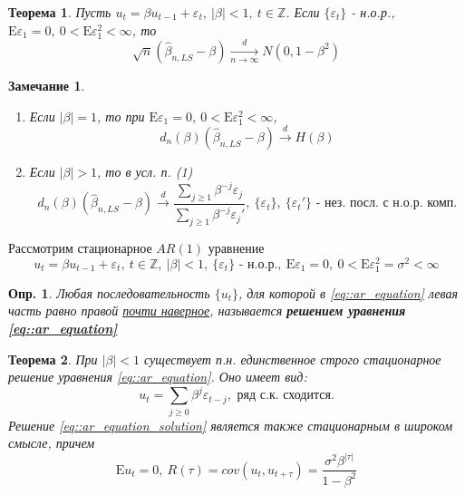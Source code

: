 \documentclass[12pt]{article}
\newtheorem{definition}{Опр.}
\newtheorem{theorem}{Теорема}
\newtheorem*{remark*}{Замечание}
\newcommand\defin[1]{\textbf{#1}}
\def\eps{ \varepsilon }
\def\Z{ \mathbb{Z} }
\def\E{ \mathrm{E} }
\begin{document}
\begin{theorem} \label{th::beta_ls_d_conv_ar}
    Пусть $u_t=\beta u_{t-1}+\eps_t,\ \left\lvert \beta\right\rvert <1,\ t\in\Z$. Если $\{\eps_t\}$ - н.о.р.,
    $\E\eps_1=0,\ 0<\E\eps_1^2<\infty$, то
    \[\sqrt{n}(\widehat{\beta}_{n,LS}-\beta)\underset{n\rightarrow\infty}{\xrightarrow{d}}N(0,1-\beta^2)\]
\end{theorem}
\begin{remark*}
    \begin{enumerate}
        \item Если $\left\lvert \beta\right\rvert =1$, то при $\E\eps_1=0,\ 0<\E\eps_1^2<\infty$,
        \[d_n(\beta)(\widehat{\beta}_{n,LS}-\beta)\xrightarrow{d}H(\beta)\]
        \item Если $\left\lvert \beta\right\rvert >1$, то в усл. п. (1)
        \[d_n(\beta)(\widehat{\beta}_{n,LS}-\beta)\xrightarrow{d}\frac{\sum_{j\geq1}\beta^{-j}\eps_j}{\sum_{j\geq1}\beta^{-j}\eps_j'},\ \{\eps_t\},\ \{\eps_t'\}\text{ - нез. посл. с н.о.р. комп.}\]
    \end{enumerate}
\end{remark*}
Рассмотрим стационарное $AR(1)$ уравнение
\begin{equation}\label{eq::ar_equation}
    u_t=\beta u_{t-1}+\eps_t,\ t\in\Z,\ \left\lvert \beta\right\rvert <1,\ \{\eps_t\}\text{ - н.о.р.},\ \E\eps_1=0,\ 0<\E\eps_1^2=\sigma^2<\infty
\end{equation}
\begin{definition}
    Любая последовательность $\{u_t\}$, для которой в \eqref{eq::ar_equation} левая часть
    равно правой \underline{почти наверное}, называется \defin{решением уравнения \eqref{eq::ar_equation}}
\end{definition}
\begin{theorem} \label{th::single_stat_solution_ar}
    При $\left\lvert \beta\right\rvert <1$ существует п.н. единственное строго стационарное решение уравнения \eqref{eq::ar_equation}.
    Оно имеет вид:
    \begin{equation}\label{eq::ar_equation_solution}
        u_t=\sum_{j\geq0}\beta^j\eps_{t-j},\text{ ряд с.к. сходится.}
    \end{equation}
    Решение \eqref{eq::ar_equation_solution} является также стационарным в широком смысле,
    причем
    \[\E u_t=0,\ R(\tau)=cov(u_t,u_{t+\tau})=\frac{\sigma^2\beta^{\left\lvert \tau\right\rvert }}{1-\beta^2}\]
\end{theorem}
\end{document}
